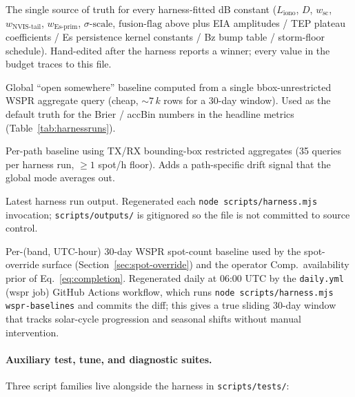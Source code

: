\documentclass[11pt,a4paper]{article}
\begin{document}
\begin{description}[nosep]
  \item[\texttt{src/constants.js}.]  The single source of truth
    for every harness-fitted dB constant
    ($L_{\text{iono}}$, $D$, $w_{\text{sc}}$, $w_{\text{NVIS-tail}}$,
    $w_{\text{Es-prim}}$, $\sigma\text{-scale}$, $\text{fusion-flag}$
    above plus EIA amplitudes / TEP plateau coefficients / Es
    persistence kernel constants / Bz bump table / storm-floor
    schedule).  Hand-edited after the harness reports a winner;
    every value in the budget traces to this file.
  \item[\texttt{scripts/data/harness.baseline.json}.]  Global
    ``open somewhere'' baseline computed from a single
    bbox-unrestricted WSPR aggregate query (cheap, ${\sim}\!7\,k$
    rows for a 30-day window).  Used as the default truth for the
    Brier / accBin numbers in the headline metrics
    (Table~\ref{tab:harnessruns}).
  \item[\texttt{scripts/data/harness.baseline.perpath.json}.]
    Per-path baseline using TX/RX bounding-box restricted aggregates
    (35 queries per harness run, $\geq 1$ spot/h floor).  Adds a
    path-specific drift signal that the global mode averages out.
  \item[\texttt{scripts/outputs/harness.report.json}.]  Latest harness
    run output.  Regenerated each \texttt{node scripts/harness.mjs}
    invocation; \texttt{scripts/outputs/} is gitignored so the
    file is not committed to source control.
  \item[\texttt{src/data/spot-baselines.mjs}.]  Per-(band, UTC-hour)
    30-day WSPR spot-count baseline used by the spot-override
    surface (Section~\ref{sec:spot-override}) and the operator
    Comp.\ availability prior of Eq.~\ref{eq:completion}.
    Regenerated daily at 06:00 UTC by the
    \texttt{daily.yml} (wspr job) GitHub Actions workflow, which
    runs \texttt{node scripts/harness.mjs wspr-baselines} and
    commits the diff; this gives a true sliding 30-day window
    that tracks solar-cycle progression and seasonal shifts
    without manual intervention.
\end{description}

\paragraph{Auxiliary test, tune, and diagnostic suites.}  Three
script families live alongside the harness in
\texttt{scripts/tests/}:
\end{document}
